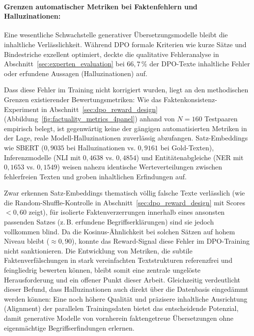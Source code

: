 \paragraph{Grenzen automatischer Metriken bei Faktenfehlern und Halluzinationen:}
Eine wesentliche Schwachstelle generativer Übersetzungsmodelle bleibt die inhaltliche Verlässlichkeit. Während DPO formale Kriterien wie kurze Sätze und Bindestriche exzellent optimiert, deckte die qualitative Fehleranalyse in Abschnitt~\ref{sec:experten_evaluation} bei $66{,}7\,\%$ der DPO-Texte inhaltliche Fehler oder erfundene Aussagen (Halluzinationen) auf. 

Dass diese Fehler im Training nicht korrigiert wurden, liegt an den methodischen Grenzen existierender Bewertungsmetriken: Wie das Faktenkonsistenz-Experiment in Abschnitt~\ref{sec:dpo_reward_design} (Abbildung~\ref{fig:factuality_metrics_4panel}) anhand von $N=160$ Testpaaren empirisch belegt, ist gegenwärtig keine der gängigen automatisierten Metriken in der Lage, reale Modell-Halluzinationen zuverlässig abzufangen. Satz-Embeddings wie SBERT ($0{,}9035$ bei Halluzinationen vs. $0{,}9161$ bei Gold-Texten), Inferenzmodelle (NLI mit $0{,}4638$ vs. $0{,}4854$) und Entitätenabgleiche (NER mit $0{,}1653$ vs. $0{,}1549$) weisen nahezu identische Werteverteilungen zwischen fehlerfreien Texten und groben inhaltlichen Erfindungen auf.

Zwar erkennen Satz-Embeddings thematisch völlig falsche Texte verlässlich (wie die Random-Shuffle-Kontrolle in Abschnitt~\ref{sec:dpo_reward_design} mit Scores $< 0{,}60$ zeigt), für isolierte Faktenverzerrungen innerhalb eines ansonsten passenden Satzes (z.\,B. erfundene Begriffserklärungen) sind sie jedoch vollkommen blind. Da die Kosinus-Ähnlichkeit bei solchen Sätzen auf hohem Niveau bleibt ($\approx 0{,}90$), konnte das Reward-Signal diese Fehler im DPO-Training nicht sanktionieren. Die Entwicklung von Metriken, die subtile Faktenverfälschungen in stark vereinfachten Textstrukturen referenzfrei und feingliedrig bewerten können, bleibt somit eine zentrale ungelöste Herausforderung und ein offener Punkt dieser Arbeit. Gleichzeitig verdeutlicht dieser Befund, dass Halluzinationen auch direkt über die Datenbasis eingedämmt werden können: Eine noch höhere Qualität und präzisere inhaltliche Ausrichtung (Alignment) der parallelen Trainingsdaten bietet das entscheidende Potenzial, damit generative Modelle von vornherein faktengetreue Übersetzungen ohne eigenmächtige Begriffserfindungen erlernen.

